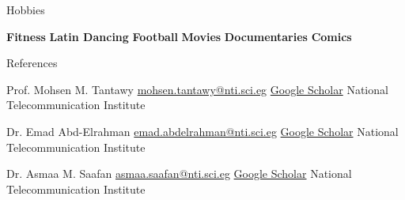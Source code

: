 \documentclass[]{mcdowellcv}
\begin{document}
	\begin{cvsection}{Hobbies}
		\begin{cvsubsection}{}{}{}
			\textbf{Fitness} \hspace{1.5cm}
			\textbf{Latin Dancing} \hspace{1.5cm}
			\textbf{Football} \hspace{1.5cm}
			\textbf{Movies} \hspace{1.5cm}
			\textbf{Documentaries} \hspace{1.5cm}
			\textbf{Comics}
		\end{cvsubsection}
	\end{cvsection}
	
	
	\begin{cvsection}{References}
		\begin{cvsubsection}{Prof. Mohsen M. Tantawy}
			{\href{mailto:mohsen.tantawy@nti.sci.eg}{mohsen.tantawy@nti.sci.eg}}
			{\href{https://scholar.google.com.eg/citations?user=gT9R42IAAAAJ\&hl=en}{Google Scholar}}
			National Telecommunication Institute
		\end{cvsubsection}
		
		\begin{cvsubsection}{Dr. Emad Abd-Elrahman}
			{\href{mailto:emad.abdelrahman@nti.sci.eg}{emad.abdelrahman@nti.sci.eg}}
			{\href{https://scholar.google.com.eg/citations?hl=en\&user=b7V0T3sAAAAJ}{Google Scholar}}
			National Telecommunication Institute
		\end{cvsubsection}
		
		\begin{cvsubsection}{Dr. Asmaa M. Saafan}
			{\href{mailto:asmaa.saafan@nti.sci.eg}{asmaa.saafan@nti.sci.eg}}
			{\href{https://scholar.google.com.eg/citations?hl=en\&user=Zl-Caz0AAAAJ}{Google Scholar}}
			National Telecommunication Institute
		\end{cvsubsection}
	\end{cvsection}
	
	
	
	
	
	
	
	
	
\end{document}
